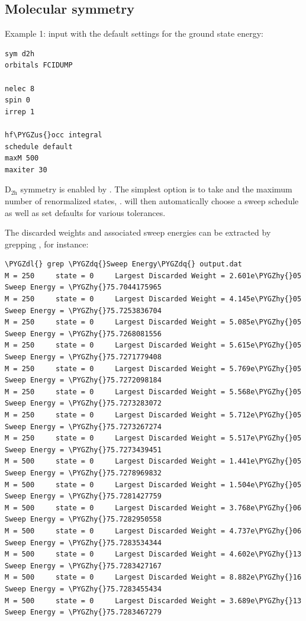 \documentclass[letterpaper,10pt,english]{sphinxmanual}
\def\PYGZus{\char`\_}
\def\PYGZdl{\char`\$}
\def\PYGZhy{\char`\-}
\def\PYGZdq{\char`\"}
\begin{document}
\subsection{Molecular symmetry}
\label{examples:molecular-symmetry}
Example 1:  input with the default settings for the ground state energy:

\begin{Verbatim}[commandchars=\\\{\}]
sym d2h
orbitals FCIDUMP

nelec 8
spin 0
irrep 1

hf\PYGZus{}occ integral
schedule default
maxM 500
maxiter 30
\end{Verbatim}

D$_{\text{2h}}$ symmetry is enabled by .
The simplest option is to take  and the maximum number of renormalized states, .
 will then automatically choose a sweep schedule as well as set defaults for various tolerances.

The discarded weights and associated sweep energies can be extracted by grepping , for instance:

\begin{Verbatim}[commandchars=\\\{\}]
\PYGZdl{} grep \PYGZdq{}Sweep Energy\PYGZdq{} output.dat
M = 250     state = 0     Largest Discarded Weight = 2.601e\PYGZhy{}05  Sweep Energy = \PYGZhy{}75.7044175965
M = 250     state = 0     Largest Discarded Weight = 4.145e\PYGZhy{}05  Sweep Energy = \PYGZhy{}75.7253836704
M = 250     state = 0     Largest Discarded Weight = 5.085e\PYGZhy{}05  Sweep Energy = \PYGZhy{}75.7268081556
M = 250     state = 0     Largest Discarded Weight = 5.615e\PYGZhy{}05  Sweep Energy = \PYGZhy{}75.7271779408
M = 250     state = 0     Largest Discarded Weight = 5.769e\PYGZhy{}05  Sweep Energy = \PYGZhy{}75.7272098184
M = 250     state = 0     Largest Discarded Weight = 5.568e\PYGZhy{}05  Sweep Energy = \PYGZhy{}75.7273283072
M = 250     state = 0     Largest Discarded Weight = 5.712e\PYGZhy{}05  Sweep Energy = \PYGZhy{}75.7273267274
M = 250     state = 0     Largest Discarded Weight = 5.517e\PYGZhy{}05  Sweep Energy = \PYGZhy{}75.7273439451
M = 500     state = 0     Largest Discarded Weight = 1.441e\PYGZhy{}05  Sweep Energy = \PYGZhy{}75.7278969832
M = 500     state = 0     Largest Discarded Weight = 1.504e\PYGZhy{}05  Sweep Energy = \PYGZhy{}75.7281427759
M = 500     state = 0     Largest Discarded Weight = 3.768e\PYGZhy{}06  Sweep Energy = \PYGZhy{}75.7282950558
M = 500     state = 0     Largest Discarded Weight = 4.737e\PYGZhy{}06  Sweep Energy = \PYGZhy{}75.7283534344
M = 500     state = 0     Largest Discarded Weight = 4.602e\PYGZhy{}13  Sweep Energy = \PYGZhy{}75.7283427167
M = 500     state = 0     Largest Discarded Weight = 8.882e\PYGZhy{}16  Sweep Energy = \PYGZhy{}75.7283455434
M = 500     state = 0     Largest Discarded Weight = 3.689e\PYGZhy{}13  Sweep Energy = \PYGZhy{}75.7283467279
\end{Verbatim}
\end{document}
